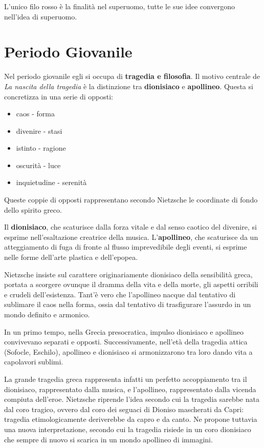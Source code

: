 \documentclass[a4paper, twoside, titlepage]{book}
\begin{document}
L’unico filo rosso è la finalità nel superuomo, tutte le sue idee convergono nell’idea di superuomo.

\chapter{Periodo Giovanile}

Nel periodo giovanile egli si occupa di \textbf{tragedia e filosofia}. Il motivo centrale de \textit{La nascita della tragedia} è la distinzione tra \textbf{dionisiaco} e \textbf{apollineo}. Questa si concretizza in una serie di opposti:
\begin{itemize}
\item caos - forma
\item divenire - stasi
\item istinto - ragione
\item oscurità - luce
\item inquietudine - serenità
\end{itemize}

Queste coppie di opposti rappresentano secondo Nietzsche le coordinate di fondo dello spirito greco.

Il \textbf{dionisiaco}, che scaturisce dalla forza vitale e dal senso caotico del divenire, si esprime nell'esaltazione creatrice della musica. L'\textbf{apollineo}, che scaturisce da un atteggiamento di fuga di fronte al flusso imprevedibile degli eventi, si esprime nelle forme dell'arte plastica e dell'epopea.

Nietzsche insiste sul carattere originariamente dionisiaco della sensibilità greca, portata a scorgere ovunque il dramma della vita e della morte, gli aspetti orribili e crudeli dell'esistenza. Tant'è vero che l'apollineo nacque dal tentativo di sublimare il caos nella forma, ossia dal tentativo di trasfigurare l'assurdo in un mondo definito e armonico.

In un primo tempo, nella Grecia presocratica, impulso dionisiaco e apollineo convivevano separati e opposti. Successivamente, nell'età della tragedia attica (Sofocle, Eschilo), apollineo e dionisiaco si armonizzarono tra loro dando vita a capolavori sublimi.

La grande tragedia greca rappresenta infatti un perfetto accoppiamento tra il dionisiaco, rappresentato dalla musica, e l'apollineo, rappresentato dalla vicenda compiuta dell'eroe. Nietzsche riprende l'idea secondo cui la tragedia sarebbe nata dal coro tragico, ovvero dal coro dei seguaci di Dioniso mascherati da Capri: tragedia etimologicamente deriverebbe da capro e da canto. Ne propone tuttavia una nuova interpretazione, secondo cui la tragedia risiede in un coro dionisiaco che sempre di nuovo si scarica in un mondo apollineo di immagini.
\end{document}
